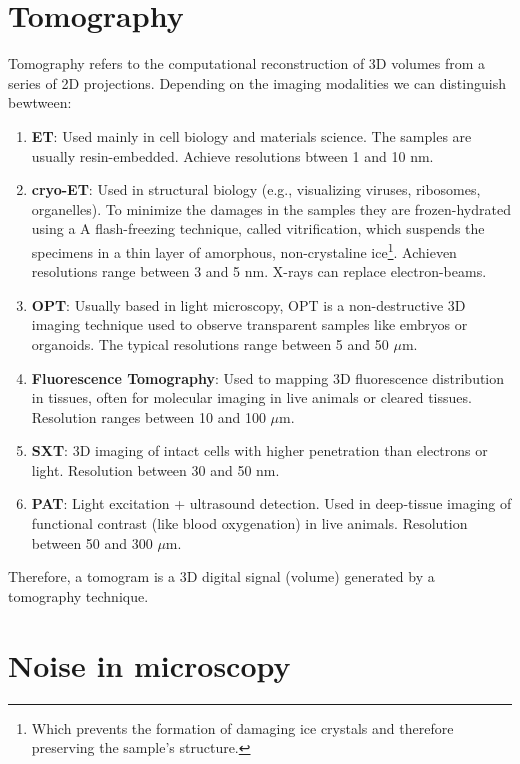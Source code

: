 
\section{Tomography}

Tomography refers to the computational reconstruction of 3D volumes
from a series of 2D projections. Depending on the imaging modalities
we can distinguish bewtween:
\begin{enumerate}
\item \textbf{\gls{ET}}: Used mainly in cell biology and materials
  science. The samples are usually resin-embedded. Achieve resolutions
  btween 1 and 10 nm.
\item \textbf{\gls{cryo-ET}}: Used in structural biology (e.g.,
  visualizing viruses, ribosomes, organelles). To minimize the damages
  in the samples they are frozen-hydrated using a A flash-freezing
  technique, called vitrification, which suspends the specimens in a
  thin layer of amorphous, non-crystaline ice\footnote{Which prevents
    the formation of damaging ice crystals and therefore preserving
    the sample's structure.}. Achieven resolutions range between 3 and
  5 nm. X-rays can replace electron-beams.
\item \textbf{\gls{OPT}}: Usually based in
  light microscopy, OPT is a non-destructive 3D imaging technique used
  to observe transparent samples like embryos or organoids. The
  typical resolutions range between 5 and 50 $\mu$m.
\item \textbf{Fluorescence Tomography}: Used to mapping 3D
  fluorescence distribution in tissues, often for molecular imaging in
  live animals or cleared tissues. Resolution ranges between 10 and
  100 $\mu$m.
\item \textbf{\gls{SXT}}: 3D imaging of intact cells with
  higher penetration than electrons or light. Resolution between 30
  and 50 nm.
\item \textbf{\gls{PAT}}: Light excitation + ultrasound
  detection. Used in deep-tissue imaging of functional contrast (like
  blood oxygenation) in live animals. Resolution between 50 and 300
  $\mu$m.
\end{enumerate}

Therefore, a tomogram is a 3D digital signal (volume) generated by a
tomography technique.


\section{Noise in microscopy}

